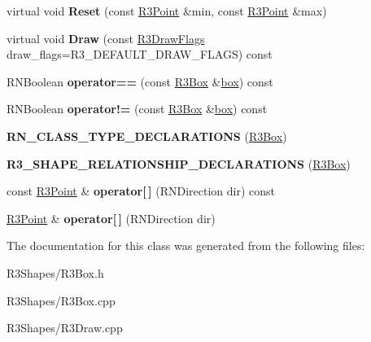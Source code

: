 \begin{DoxyCompactItemize}
\item 
virtual void {\bfseries Reset} (const \hyperlink{class_r3_point}{R3\+Point} \&min, const \hyperlink{class_r3_point}{R3\+Point} \&max)\hypertarget{class_r3_box_aae9033153563426386648cc48d064879}{}\label{class_r3_box_aae9033153563426386648cc48d064879}

\item 
virtual void {\bfseries Draw} (const \hyperlink{class_r_n_flags}{R3\+Draw\+Flags} draw\+\_\+flags=R3\+\_\+\+D\+E\+F\+A\+U\+L\+T\+\_\+\+D\+R\+A\+W\+\_\+\+F\+L\+A\+GS) const \hypertarget{class_r3_box_aa4b54970958dfc3d09283985ba0d30c9}{}\label{class_r3_box_aa4b54970958dfc3d09283985ba0d30c9}

\item 
R\+N\+Boolean {\bfseries operator==} (const \hyperlink{class_r3_box}{R3\+Box} \&\hyperlink{structbox}{box}) const \hypertarget{class_r3_box_a1b667d365e402dd1b4449e93dd906237}{}\label{class_r3_box_a1b667d365e402dd1b4449e93dd906237}

\item 
R\+N\+Boolean {\bfseries operator!=} (const \hyperlink{class_r3_box}{R3\+Box} \&\hyperlink{structbox}{box}) const \hypertarget{class_r3_box_ac87e3d69359ea2e7cdc698b548f71347}{}\label{class_r3_box_ac87e3d69359ea2e7cdc698b548f71347}

\item 
{\bfseries R\+N\+\_\+\+C\+L\+A\+S\+S\+\_\+\+T\+Y\+P\+E\+\_\+\+D\+E\+C\+L\+A\+R\+A\+T\+I\+O\+NS} (\hyperlink{class_r3_box}{R3\+Box})\hypertarget{class_r3_box_a2b228f65063fefe5058696f3b254688f}{}\label{class_r3_box_a2b228f65063fefe5058696f3b254688f}

\item 
{\bfseries R3\+\_\+\+S\+H\+A\+P\+E\+\_\+\+R\+E\+L\+A\+T\+I\+O\+N\+S\+H\+I\+P\+\_\+\+D\+E\+C\+L\+A\+R\+A\+T\+I\+O\+NS} (\hyperlink{class_r3_box}{R3\+Box})\hypertarget{class_r3_box_a36d44c02426cba12ed2b124acca5bc36}{}\label{class_r3_box_a36d44c02426cba12ed2b124acca5bc36}

\item 
const \hyperlink{class_r3_point}{R3\+Point} \& {\bfseries operator\mbox{[}$\,$\mbox{]}} (R\+N\+Direction dir) const \hypertarget{class_r3_box_a0218b145a9df7010e14808794f5e952b}{}\label{class_r3_box_a0218b145a9df7010e14808794f5e952b}

\item 
\hyperlink{class_r3_point}{R3\+Point} \& {\bfseries operator\mbox{[}$\,$\mbox{]}} (R\+N\+Direction dir)\hypertarget{class_r3_box_a7db3d21fa3b3189ad759cf49e2f7d157}{}\label{class_r3_box_a7db3d21fa3b3189ad759cf49e2f7d157}

\end{DoxyCompactItemize}


The documentation for this class was generated from the following files\+:\begin{DoxyCompactItemize}
\item 
R3\+Shapes/R3\+Box.\+h\item 
R3\+Shapes/R3\+Box.\+cpp\item 
R3\+Shapes/R3\+Draw.\+cpp\end{DoxyCompactItemize}
